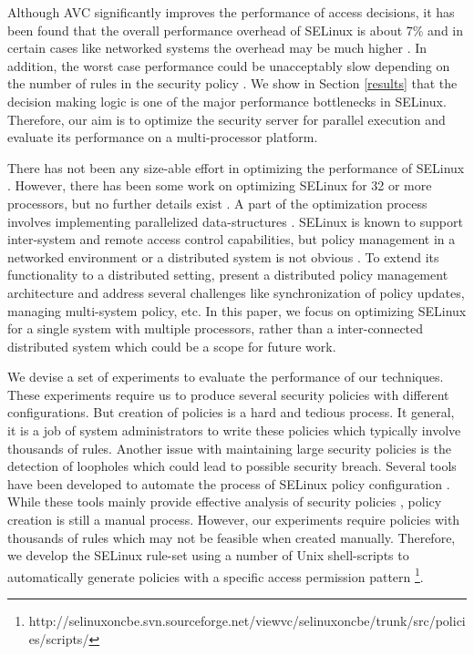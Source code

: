 \documentclass[conference]{IEEEtran}
\begin{document}
Although AVC significantly improves the performance of access
decisions, it has been found that the overall performance overhead of
SELinux is about 7\% and in certain cases like networked systems the
overhead may be much higher \cite{selinuxFAQ}. In addition, the worst
case performance could be unacceptably slow depending on the number of
rules in the security policy \cite{report}. We show in Section
\ref{results} that the decision making logic is one of the major
performance bottlenecks in SELinux. Therefore, our aim is to optimize
the security server for parallel execution and evaluate its
performance on a multi-processor platform.

There has not been any size-able effort in optimizing the performance
of SELinux \cite{selinuxFAQ}. However, there has been some work on
optimizing SELinux for 32 or more processors, but no further details
exist \cite{selinuxFAQ}. A part of the optimization process involves
implementing parallelized data-structures \cite{ll1}. SELinux is known
to support inter-system and remote access control capabilities, but
policy management in a networked environment or a distributed system
is not obvious \cite{tresys}. To extend its functionality to a
distributed setting, \cite{tresys} present a distributed policy
management architecture and address several challenges like
synchronization of policy updates, managing multi-system policy,
etc. In this paper, we focus on optimizing SELinux for a single system
with multiple processors, rather than a inter-connected distributed
system which could be a scope for future work.

We devise a set of experiments to evaluate the performance of our
techniques. These experiments require us to produce several security
policies with different configurations. But creation of policies is a
hard and tedious process. It general, it is a job of system
administrators to write these policies which typically involve
thousands of rules. Another issue with maintaining large security
policies is the detection of loopholes which could lead to possible
security breach. Several tools have been developed to automate the
process of SELinux policy configuration \cite{selinuxTools}. While
these tools mainly provide effective analysis of security policies
\cite{selinuxTools}, policy creation is still a manual
process. However, our experiments require policies with thousands of
rules which may not be feasible when created manually. Therefore, we
develop the SELinux rule-set using a number of Unix shell-scripts to
automatically generate policies with a specific access permission
pattern
\footnote{http://selinuxoncbe.svn.sourceforge.net/viewvc/selinuxoncbe/trunk/src/policies/scripts/}.
\end{document}
